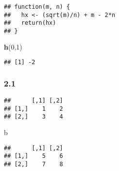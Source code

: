 \documentclass[
]{article}
\newenvironment{Shaded}{\begin{snugshade}}{\end{snugshade}}
\newcommand{\CommentTok}[1]{\textcolor[rgb]{0.56,0.35,0.01}{\textit{#1}}}
\newcommand{\ControlFlowTok}[1]{\textcolor[rgb]{0.13,0.29,0.53}{\textbf{#1}}}
\newcommand{\DecValTok}[1]{\textcolor[rgb]{0.00,0.00,0.81}{#1}}
\newcommand{\KeywordTok}[1]{\textcolor[rgb]{0.13,0.29,0.53}{\textbf{#1}}}
\newcommand{\NormalTok}[1]{#1}
\newcommand{\OperatorTok}[1]{\textcolor[rgb]{0.81,0.36,0.00}{\textbf{#1}}}
\newcommand{\OtherTok}[1]{\textcolor[rgb]{0.56,0.35,0.01}{#1}}
\newcommand{\StringTok}[1]{\textcolor[rgb]{0.31,0.60,0.02}{#1}}
\begin{document}
\begin{verbatim}
## function(m, n) {
##   hx <- (sqrt(m)/n) + m - 2*n
##   return(hx)
## }
\end{verbatim}

\begin{Shaded}
\begin{Highlighting}[]
\KeywordTok{h}\NormalTok{(}\DecValTok{0}\NormalTok{,}\DecValTok{1}\NormalTok{)}
\end{Highlighting}
\end{Shaded}

\begin{verbatim}
## [1] -2
\end{verbatim}

\hypertarget{section-3}{%
\subsubsection{2.1}\label{section-3}}

\begin{Shaded}
\end{Shaded}

\begin{verbatim}
##      [,1] [,2]
## [1,]    1    2
## [2,]    3    4
\end{verbatim}

\begin{Shaded}
\begin{Highlighting}[]
\NormalTok{b}
\end{Highlighting}
\end{Shaded}

\begin{verbatim}
##      [,1] [,2]
## [1,]    5    6
## [2,]    7    8
\end{verbatim}

\begin{Shaded}
\end{Shaded}
\end{document}
